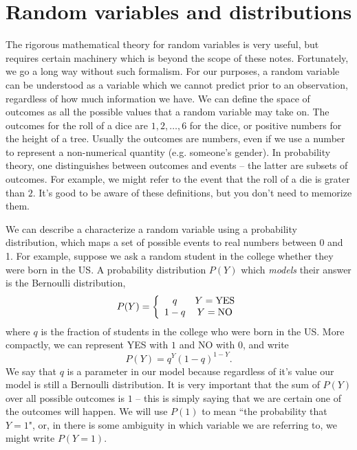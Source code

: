 \section{Random variables and distributions}

The rigorous mathematical theory for random variables is very useful, but requires certain machinery which is beyond the scope of these notes. Fortunately, we go a long way without such formalism. For our purposes, a random variable can be understood as a variable which we cannot predict prior to an observation, regardless of how much information we have.
We can define the space of  {\dfn outcomes} as all the possible values that a random variable may take on. The outcomes for the roll of a dice are $1,2,\dots,6$ for the dice, or positive numbers for the height of a tree.  Usually the outcomes are numbers, even if we use a number to represent a non-numerical quantity (e.g. someone's gender). In probability theory, one distinguishes between outcomes and {\dfn events} -- the latter are subsets of outcomes. For example, we might refer to the event that the roll of a die is grater than $2$. It's good to be aware of these definitions, but you don't need to memorize them.



We can describe a characterize a random variable using  a {\dfn probability distribution}, which maps a set of possible events to real numbers between 0 and 1.   For example, suppose we ask a random student in the college whether they were born in the US. A probability distribution $P(Y)$ which \emph{models} their answer is the {\dfn Bernoulli distribution},
\begin{equation}
P(Y) = \left\{ \begin{array}{cc}
q & Y={\rm YES}\\
1-q & Y={\rm NO}
\end{array}
 \right.
\end{equation}
where $q$ is the fraction of students in the college who were born in the US. More compactly, we can represent YES with $1$ and NO with $0$, and write
\begin{equation}
P(Y) = q^Y(1-q)^{1-Y}.
\end{equation}
  We say that $q$ is a {\dfn parameter} in our model because regardless of it's value our model is still a Bernoulli distribution.  It is very important that the sum of $P(Y)$ over all possible outcomes is $1$ -- this is simply saying that we are certain one of the outcomes will happen. We will use $P(1)$ to mean ``the probability that $Y=1$", or, in there is some ambiguity in which variable we are referring to, we might write $P(Y=1)$. 
 
